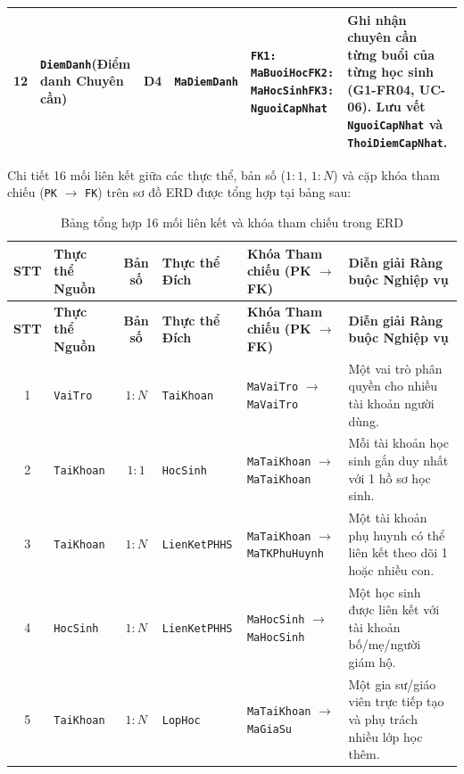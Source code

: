 {\begin{longtable}{@{}c >{\raggedright\arraybackslash}p{2.2cm} c >{\raggedright\arraybackslash}p{1.9cm} >{\raggedright\arraybackslash}p{2.6cm} >{\raggedright\arraybackslash}p{4.8cm}@{}}
\midrule
12 & \texttt{DiemDanh}\newline (Điểm danh Chuyên cần) & D4 & \texttt{MaDiemDanh} & \texttt{FK1: MaBuoiHoc}\newline \texttt{FK2: MaHocSinh}\newline \texttt{FK3: NguoiCapNhat} & Ghi nhận chuyên cần từng buổi của từng học sinh (G1-FR04, UC-06). Lưu vết \texttt{NguoiCapNhat} và \texttt{ThoiDiemCapNhat}. \\
\bottomrule
\end{longtable}
}

Chi tiết 16 mối liên kết giữa các thực thể, bản số ($1:1$, $1:N$) và cặp khóa tham chiếu (\texttt{PK} $\rightarrow$ \texttt{FK}) trên sơ đồ ERD được tổng hợp tại bảng sau:

{\footnotesize
\begin{longtable}{@{}c >{\raggedright\arraybackslash}p{2.0cm} c >{\raggedright\arraybackslash}p{2.0cm} >{\raggedright\arraybackslash}p{3.6cm} >{\raggedright\arraybackslash}p{4.5cm}@{}}
\caption{Bảng tổng hợp 16 mối liên kết và khóa tham chiếu trong ERD}\label{tab:erd-links}\\
\toprule
\textbf{STT} & \textbf{Thực thể Nguồn} & \textbf{Bản số} & \textbf{Thực thể Đích} & \textbf{Khóa Tham chiếu (PK $\rightarrow$ FK)} & \textbf{Diễn giải Ràng buộc Nghiệp vụ} \\
\midrule
\endfirsthead
\toprule
\textbf{STT} & \textbf{Thực thể Nguồn} & \textbf{Bản số} & \textbf{Thực thể Đích} & \textbf{Khóa Tham chiếu (PK $\rightarrow$ FK)} & \textbf{Diễn giải Ràng buộc Nghiệp vụ} \\
\midrule
\endhead
1 & \texttt{VaiTro} & $1 : N$ & \texttt{TaiKhoan} & \texttt{MaVaiTro} $\rightarrow$ \texttt{MaVaiTro} & Một vai trò phân quyền cho nhiều tài khoản người dùng. \\
2 & \texttt{TaiKhoan} & $1 : 1$ & \texttt{HocSinh} & \texttt{MaTaiKhoan} $\rightarrow$ \texttt{MaTaiKhoan} & Mỗi tài khoản học sinh gắn duy nhất với 1 hồ sơ học sinh. \\
3 & \texttt{TaiKhoan} & $1 : N$ & \texttt{LienKetPHHS} & \texttt{MaTaiKhoan} $\rightarrow$ \texttt{MaTKPhuHuynh} & Một tài khoản phụ huynh có thể liên kết theo dõi 1 hoặc nhiều con. \\
4 & \texttt{HocSinh} & $1 : N$ & \texttt{LienKetPHHS} & \texttt{MaHocSinh} $\rightarrow$ \texttt{MaHocSinh} & Một học sinh được liên kết với tài khoản bố/mẹ/người giám hộ. \\
5 & \texttt{TaiKhoan} & $1 : N$ & \texttt{LopHoc} & \texttt{MaTaiKhoan} $\rightarrow$ \texttt{MaGiaSu} & Một gia sư/giáo viên trực tiếp tạo và phụ trách nhiều lớp học thêm. \\

\end{longtable}}
